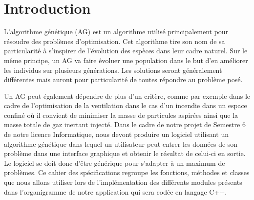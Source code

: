 \documentclass[a4paper,11pt]{article}
\title{\vspace{13em}{\huge Cahier des Spécifications}}
\author{Edouard Fouassier - Maxime Gonthier - Benjamin Guillot\\
		Laureline Martin - Rémi Navarro - Lydia Rodrigez de la Nava
		\vspace{2em}\\
		Algorithme Génétique
		\vspace{2em}}
\begin{document}
	
	\clearpage
	\maketitle\vspace{13em}
\newpage
\tableofcontents
\newpage\clearpage{}
	
	\section{Introduction}
		L’algorithme génétique (AG) est un algorithme utilisé principalement pour résoudre des problèmes d’optimisation. 
		Cet algorithme tire son nom de sa particularité à s’inspirer de l’évolution des espèces dans leur cadre naturel.
		Sur le même principe, un AG va faire évoluer une population dans le but d’en améliorer les individus sur plusieurs générations.
		Les solutions seront généralement différentes mais auront pour particularité de toutes répondre au problème posé.

		Un AG peut également dépendre de plus d'un critère, comme par exemple dans le cadre de l'optimisation de la ventilation dans le cas d’un incendie dans un espace confiné où il convient de minimiser la masse de particules aspirées ainsi que la masse totale de gaz inertant injecté.
		Dans le cadre de notre projet de Semestre 6 de notre licence Informatique, nous devont produire un logiciel utilisant un algorithme génétique dans lequel un utilisateur peut entrer les données de son problème dans une interface graphique et obtenir le résultat de celui-ci en sortie. Le logiciel se doit donc d'être générique pour s'adapter à un maximum de problèmes.
		Ce cahier des spécifications regroupe les fonctions, méthodes et classes que nous allons utiliser lors de l’implémentation des différents modules présents dans l'organigramme de notre application qui sera codée en langage C++.
\end{document}
